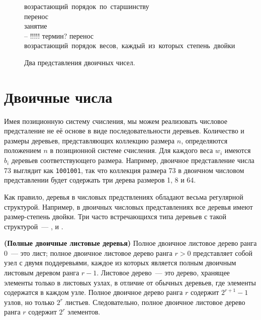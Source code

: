 \begin{figure}
  \centering
  
  \mbox{возрастающий порядок по старшинству}\\
  \mbox{перенос}\\
  \mbox{занятие}\\ -- !!!!! термин?
  \mbox{перенос}\\
  \mbox{возрастающий порядок весов, каждый из которых степень двойки}\\

  \caption{Два представления двоичных чисел.}
  \label{fig:9.1}
\end{figure}

\section{Двоичные числа}
\label{sc:9.2}

Имея позиционную систему счисления, мы можем реализовать числовое
предсталение не её основе в виде последовательности
деревьев. Количество и размеры деревьев, представляющих коллекцию
размера $n$, определяются положением $n$ в позиционной системе
счисления. Для каждого веса $w_i$ имеются $b_i$ деревьев
соответствующего размера. Например, двоичное представление числа 73
выглядит как \texttt{1001001}, так что коллекция размера 73 в двоичном
числовом представлении будет содержать три дерева размеров 1, 8 и 64.

Как правило, деревья в числовых предствлениях обладают весьма
регулярной структурой. Например, в двоичных числовых представлениях
все деревья имеют размер-степень двойки. Три часто встречающихся типа
деревьев с такой структурой~---  \cite{KaldewaijDielissen1996},  \cite{Vuillemin1978} и
 \cite{SackStrothotte1990}.

\begin{definition}
  \textbf{(Полные двоичные листовые деревья)} Полное двоичное листовое
  дерево ранга 0~--- это лист; полное двоичное листовое дерево ранга
  $r > 0$ представляет собой узел с двумя поддеревьями, каждое из
  которых является полным двоичным листовым деревом ранга $r -
  1$. Листовое дерево~--- это дерево, хранящее элементы только в
  листовых узлах, в отличие от обычных деревьев, где элементы
  содержатся в каждом узле. Полное двоичное дерево ранга $r$ содержит
  $2^{r+1} - 1$ узлов, но только $2^r$ листьев. Следовательно, полное
  двоичное листовое дерево ранга $r$ содержит $2^r$ элементов.
\end{definition}

